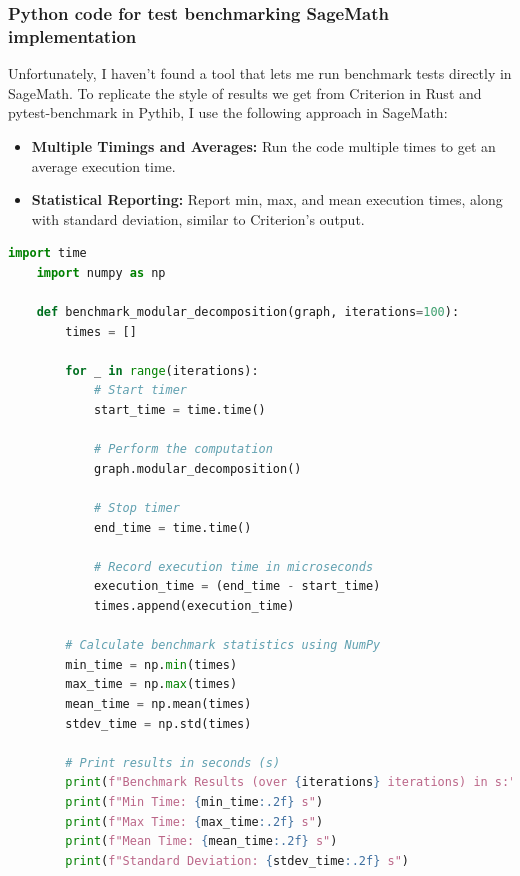 \subsubsection{Python code for test benchmarking SageMath implementation}

Unfortunately, I haven't found a tool that lets me run benchmark tests directly in SageMath.
To replicate the style of results we get from Criterion in Rust and pytest-benchmark in Pythib, I use the following approach in SageMath:
\begin{itemize}
    \item \textbf{Multiple Timings and Averages:} Run the code multiple times to get an average execution time.
    \item \textbf{Statistical Reporting:} Report min, max, and mean execution times, along with standard deviation, similar to Criterion’s output.
\end{itemize}

\begin{myex}

\end{myex}

\begin{lstlisting}[language=Python, style=python, caption={Example of benchmark code for modular decomposition}, label={lst:sagemath-example-of-benchmark-code}, firstnumber=1]
    import time
    import numpy as np

    def benchmark_modular_decomposition(graph, iterations=100):
        times = []

        for _ in range(iterations):
            # Start timer
            start_time = time.time()

            # Perform the computation
            graph.modular_decomposition()

            # Stop timer
            end_time = time.time()

            # Record execution time in microseconds
            execution_time = (end_time - start_time)
            times.append(execution_time)

        # Calculate benchmark statistics using NumPy
        min_time = np.min(times)
        max_time = np.max(times)
        mean_time = np.mean(times)
        stdev_time = np.std(times)

        # Print results in seconds (s)
        print(f"Benchmark Results (over {iterations} iterations) in s:")
        print(f"Min Time: {min_time:.2f} s")
        print(f"Max Time: {max_time:.2f} s")
        print(f"Mean Time: {mean_time:.2f} s")
        print(f"Standard Deviation: {stdev_time:.2f} s")
\end{lstlisting}


